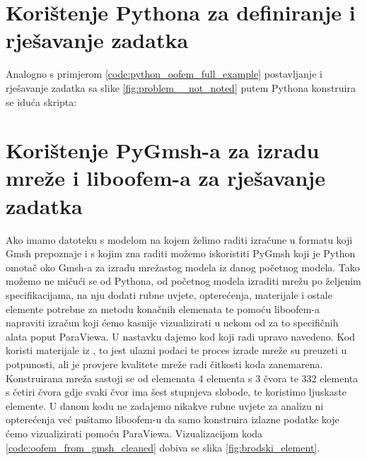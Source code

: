 \documentclass[a4paper,twoside,12pt]{memoir} %
\begin{document}


\section{Korištenje Pythona za definiranje i rješavanje zadatka}
Analogno s primjerom \ref{code:python_oofem_full_example} postavljanje i rješavanje zadatka sa slike \ref{fig:problem__not_noted} putem Pythona konstruira se iduća skripta:




\section{Korištenje PyGmsh-a za izradu mreže i liboofem-a za rješavanje zadatka}
Ako imamo datoteku s modelom na kojem želimo raditi izračune u formatu koji Gmsh prepoznaje i s kojim zna raditi možemo iskoristiti PyGmsh \cite{pygmsh_github} koji je Python omotač oko Gmsh-a za izradu mrežastog modela iz danog početnog modela. Tako možemo ne mičući se od Pythona, od početnog modela izraditi mrežu po željenim specifikacijama, na nju dodati rubne uvjete, opterećenja, materijale i ostale elemente potrebne za metodu konačnih elemenata te pomoću liboofem-a napraviti izračun koji ćemo kasnije vizualizirati u nekom od za to specifičnih alata poput ParaViewa. U nastavku dajemo kod koji radi upravo navedeno. Kod koristi materijale iz \cite{tadej}, to jest ulazni podaci te proces izrade mreže su preuzeti u potpunosti, ali je provjere kvalitete mreže radi čitkosti koda zanemarena. Konstruirana mreža sastoji se od elemenata 4 elementa s 3 čvora te 332 elementa s četiri čvora gdje svaki čvor ima šest stupnjeva slobode, te koristimo ljuskaste elemente. U danom kodu ne zadajemo nikakve rubne uvjete za analizu ni opterećenja već puštamo liboofem-u da samo konstruira izlazne podatke koje ćemo vizualizirati pomoću ParaViewa. Vizualizacijom koda \ref{code:oofem_from_gmsh_cleaned} dobiva se slika \ref{fig:brodski_element}.


\end{document}
